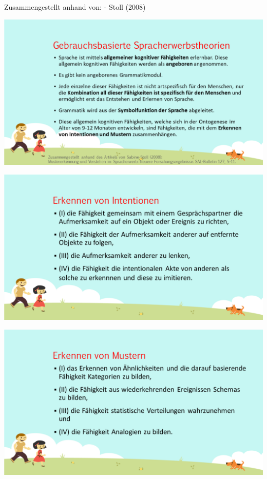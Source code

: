 \documentclass[
  letterpaper,
]{scrbook}
\begin{document}
Zusammengestellt anhand von: - Stoll (2008)

\includegraphics[width=1\textwidth,height=\textheight]{./pictures/muster_intentionen/Diapozitiv5.PNG}

\includegraphics[width=1\textwidth,height=\textheight]{./pictures/muster_intentionen/Diapozitiv6.PNG}

\includegraphics[width=1\textwidth,height=\textheight]{./pictures/muster_intentionen/Diapozitiv7.PNG}
\end{document}

